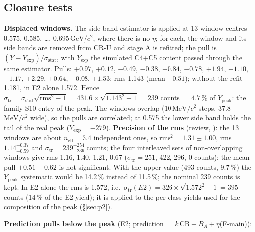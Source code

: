 \documentclass[11pt,a4paper]{article}
\newcommand{\GeVcc}{\ensuremath{\mathrm{GeV}/c^{2}}\xspace}
\newcommand{\MeVcc}{\ensuremath{\mathrm{MeV}/c^{2}}\xspace}
\newcommand{\code}[1]{\texttt{\detokenize{#1}}}
\newcommand{\Ypeak}{\ensuremath{Y_{\mathrm{peak}}}\xspace}
\begin{document}
\subsection{Closure tests}
\label{sec:closure}
\textbf{Displaced windows.} The side-band estimator is applied at 13 window centres 0.575, 0.585, \dots, 0.695\,\GeVcc, where there is no
$\eta$; for each, the window and its side bands are removed from CR-U and stage A is refitted; the pull is $(Y-Y_{\mathrm{exp}})/\sigma_{\mathrm{stat}}$,
with $Y_{\mathrm{exp}}$ the simulated C4+C5 content passed through the same estimator. Pulls: $+0.97$, $+0.12$, $-0.49$, $-0.38$, $+0.84$, $-0.78$,
$+1.94$, $+1.10$, $-1.17$, $+2.29$, $+0.64$, $+0.08$, $+1.53$; rms 1.143 (mean $+0.51$); without the refit 1.181, in E2 alone 1.572. Hence
$\sigma_{\mathrm{tr}}=\sigma_{\mathrm{stat}}\sqrt{\mathrm{rms}^2-1}=431.6\times\sqrt{1.143^2-1}=239$ counts $=4.7$\,\% of \Ypeak: the family-S10 entry of
the peak. The windows overlap (10\,\MeVcc steps, 37.8\,\MeVcc wide), so the pulls are correlated; at 0.575 the lower side band holds the tail of
the real peak ($Y_{\mathrm{exp}}=-279$). \textbf{Precision of the rms} (review, \code{fix_numbers.py}): the 13 windows are about $n_{\mathrm{eff}}=3.4$
independent ones, so $\mathrm{rms}^2=1.31\pm1.00$, rms $1.14^{+0.37}_{-0.59}$ and $\sigma_{\mathrm{tr}}=239^{+254}_{-239}$ counts; the four
interleaved sets of non-overlapping windows give rms 1.16, 1.40, 1.21, 0.67 ($\sigma_{\mathrm{tr}}=251$, 422, 296, 0 counts); the mean pull
$+0.51\pm0.62$ is not significant. With the upper value (493 counts, 9.7\,\%) the \Ypeak systematic would be 14.2\,\% instead of 11.5\,\%; the
nominal 239 counts is kept. In E2 alone the rms is 1.572, i.e.\ $\sigma_{\mathrm{tr}}(E2)=326\times\sqrt{1.572^2-1}=395$ counts (14\,\% of the E2
yield); it is applied to the per-class yields used for the composition of the peak (\S\ref{sec:p2}).

\textbf{Prediction pulls below the peak} (E2; prediction $=k\,\mathrm{CB}+B_A+\eta$(F-main)):
\end{document}
